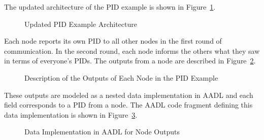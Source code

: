 The updated architecture of the PID example is shown in Figure~\ref{fig:PIDArch}. 
\begin{figure}[!htb]
        \caption{\label{fig:PIDArch} Updated PID Example Architecture}
\end{figure}

Each node reports its own PID to all other nodes in the first round of communication. In the second round, each node informs the others what they saw in terms of %
everyone's PIDs. %
The outputs from a node are described in Figure~\ref{fig:NodeOutputsPID}. %
\begin{figure}[!htb]
        \caption{\label{fig:NodeOutputsPID} Description of the Outputs of Each Node in the PID Example}
\end{figure}
These outputs are modeled as a nested data implementation in AADL and each field corresponds to a PID from a node. The AADL code fragment defining this data implementation is shown in Figure~\ref{fig:PIDNodeData}.

\begin{figure}[!htb]
        \caption{\label{fig:PIDNodeData} Data Implementation in AADL for Node Outputs}
\end{figure}

